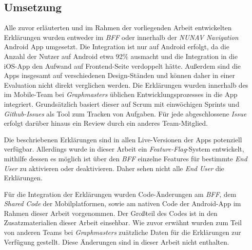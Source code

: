 \subsection{Umsetzung}

Alle zuvor erläuterten und im Rahmen der vorliegenden Arbeit entwickelten Erklärungen wurden entweder im \textit{BFF} oder innerhalb der \textit{NUNAV Navigation} Android App umgesetzt. Die Integration ist nur auf Android erfolgt, da die Anzahl der Nutzer auf Android etwa 92\% ausmacht und die Integration in die iOS-App den Aufwand auf Frontend-Seite verdoppelt hätte. Außerdem sind die Apps insgesamt auf verschiedenen Design-Ständen und können daher in einer Evaluation nicht direkt verglichen werden. Die Erklärungen wurden innerhalb des im Mobile-Team bei \textit{Graphmasters} üblichen Entwicklungsprozesses in die App integriert. Grundsätzlich basiert dieser auf Scrum mit einwöchigen Sprints und \textit{Github-Issues} als Tool zum Tracken von Aufgaben. Für jede abgeschlossene \textit{Issue} erfolgt darüber hinaus ein Review durch ein anderes Team-Mitglied.

Die beschriebenen Erklärungen sind in allen Live-Versionen der Apps potenziell verfügbar. Allerdings wurde in dieser Arbeit ein \textit{Feature-Flag}-System entwickelt, mithilfe dessen es möglich ist über den \textit{BFF} einzelne Features für bestimmte \textit{End User} zu aktivieren oder deaktivieren. Daher sehen nicht alle \textit{End User} die Erklärungen.

Für die Integration der Erklärungen wurden Code-Änderungen am \textit{BFF}, dem \textit{Shared Code} der Mobilplatformen, sowie am nativen Code der Android-App im Rahmen dieser Arbeit vorgenommen. Der Großteil des Codes ist in den Zusatzmaterialien dieser Arbeit einsehbar. Wie zuvor erwähnt wurden zum Teil von anderen Teams bei \textit{Graphmasters} zuätzliche Daten für die Erklärungen zur Verfügung gestellt. Diese Änderungen sind in dieser Arbeit nicht enthalten.

\newpage